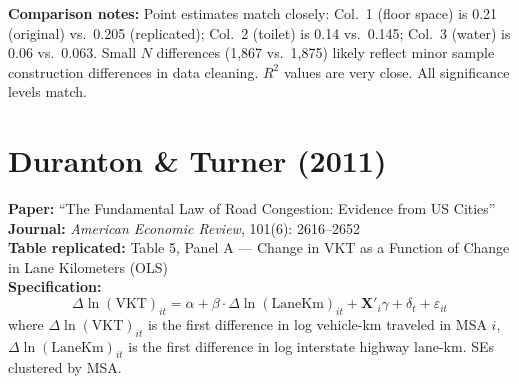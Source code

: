 \documentclass[11pt,a4paper]{article}
\begin{document}
\vspace{1cm}
\textbf{Comparison notes:} Point estimates match closely: Col.\ 1 (floor space) is 0.21 (original) vs.\ 0.205 (replicated); Col.\ 2 (toilet) is 0.14 vs.\ 0.145; Col.\ 3 (water) is 0.06 vs.\ 0.063. Small $N$ differences (1,867 vs.\ 1,875) likely reflect minor sample construction differences in data cleaning. $R^2$ values are very close. All significance levels match.

\newpage

\section{Duranton \& Turner (2011)}

\textbf{Paper:} ``The Fundamental Law of Road Congestion: Evidence from US Cities''\\
\textbf{Journal:} \textit{American Economic Review}, 101(6): 2616--2652\\
\textbf{Table replicated:} Table 5, Panel A --- Change in VKT as a Function of Change in Lane Kilometers (OLS)\\
\textbf{Specification:}
\[
\Delta \ln(\text{VKT})_{it} = \alpha + \beta \cdot \Delta \ln(\text{LaneKm})_{it} + \mathbf{X}'_i \gamma + \delta_t + \varepsilon_{it}
\]
where $\Delta \ln(\text{VKT})_{it}$ is the first difference in log vehicle-km traveled in MSA $i$, $\Delta \ln(\text{LaneKm})_{it}$ is the first difference in log interstate highway lane-km. SEs clustered by MSA.

\vspace{0.3cm}
\noindent{}
\end{document}
